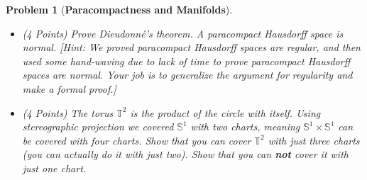 \documentclass{article}
\theoremstyle{normal}
\newtheorem{problem}{Problem}
\begin{document}
    \begin{problem}[\textbf{Paracompactness and Manifolds}]
        \par\hfill\par\vspace{2em}
        \begin{itemize}
            \item
            (4 Points)
            Prove Dieudonn\'{e}'s theorem. A paracompact Hausdorff space is
            normal.
            [Hint: We proved paracompact Hausdorff spaces are regular, and then
            used some \textit{hand-waving} due to lack of time to prove
            paracompact
            Hausdorff spaces are normal. Your job is to generalize the argument
            for regularity and make a formal proof.]
            \item
            (4 Points)
            The torus $\mathbb{T}^{2}$ is the product of the circle with itself.
            Using stereographic projection we covered $\mathbb{S}^{1}$ with
            two charts, meaning $\mathbb{S}^{1}\times\mathbb{S}^{1}$ can be
            covered with four charts. Show that you can cover $\mathbb{T}^{2}$
            with just three charts (you can actually do it with just two). Show
            that you can \textbf{not} cover it with just one chart.
        \end{itemize}
    \end{problem}
\end{document}
